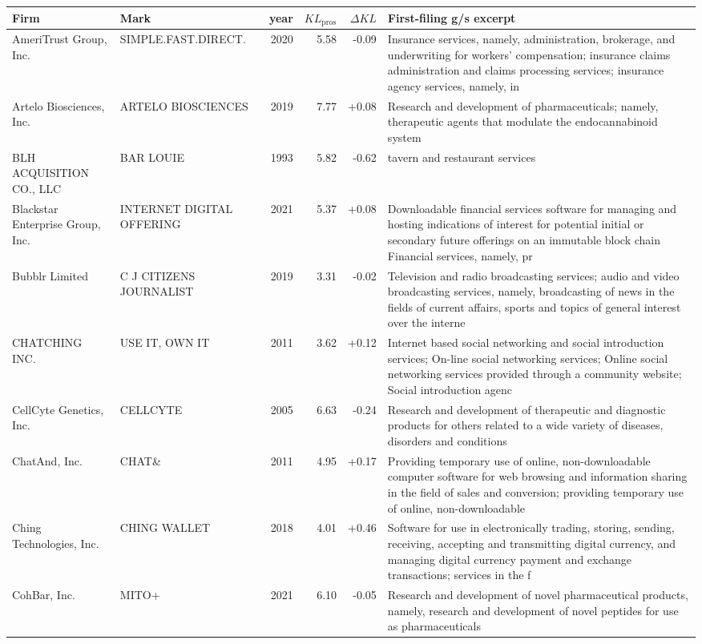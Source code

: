 \begin{tabular}{p{4.0cm}p{2.2cm}rrrp{6.5cm}}
\toprule
Firm & Mark & year & $KL_\text{pros}$ & $\Delta KL$ & First-filing g/s excerpt \\
\midrule
AmeriTrust Group, Inc. & SIMPLE.FAST.DIRECT. & 2020 & 5.58 & -0.09 & Insurance services, namely, administration, brokerage, and underwriting for workers' compensation; insurance claims administration and claims processing services; insurance agency services, namely, in \\
Artelo Biosciences, Inc. & ARTELO BIOSCIENCES & 2019 & 7.77 & +0.08 & Research and development of pharmaceuticals; namely, therapeutic agents that modulate the endocannabinoid system \\
BLH ACQUISITION CO., LLC & BAR LOUIE & 1993 & 5.82 & -0.62 & tavern and restaurant services \\
Blackstar Enterprise Group, Inc. & INTERNET DIGITAL OFFERING & 2021 & 5.37 & +0.08 & Downloadable financial services software for managing and hosting indications of interest for potential initial or secondary future offerings on an immutable block chain Financial services, namely, pr \\
Bubblr Limited & C J CITIZENS JOURNALIST & 2019 & 3.31 & -0.02 & Television and radio broadcasting services; audio and video broadcasting services, namely, broadcasting of news in the fields of current affairs, sports and topics of general interest over the interne \\
CHATCHING INC. & USE IT, OWN IT & 2011 & 3.62 & +0.12 & Internet based social networking and social introduction services; On-line social networking services; Online social networking services provided through a community website; Social introduction agenc \\
CellCyte Genetics, Inc. & CELLCYTE & 2005 & 6.63 & -0.24 & Research and development of therapeutic and diagnostic products for others related to a wide variety of diseases, disorders and conditions \\
ChatAnd, Inc. & CHAT\& & 2011 & 4.95 & +0.17 & Providing temporary use of online, non-downloadable computer software for web browsing and information sharing in the field of sales and conversion; providing temporary use of online, non-downloadable \\
Ching Technologies, Inc. & CHING WALLET & 2018 & 4.01 & +0.46 & Software for use in electronically trading, storing, sending, receiving, accepting and transmitting digital currency, and managing digital currency payment and exchange transactions; services in the f \\
CohBar, Inc. & MITO+ & 2021 & 6.10 & -0.05 & Research and development of novel pharmaceutical products, namely, research and development of novel peptides for use as pharmaceuticals \\
\bottomrule
\end{tabular}
\clearpage

